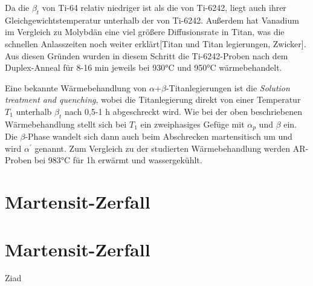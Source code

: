 Da die $\beta_{t}$ von Ti-64 relativ niedriger ist als die von Ti-6242, liegt auch ihrer Gleichgewichtstemperatur unterhalb der von Ti-6242. Außerdem hat Vanadium im Vergleich zu Molybdän eine viel größere Diffusionsrate in Titan, was die schnellen Anlasszeiten noch weiter erklärt[Titan und Titan legierungen, Zwicker]. Aus diesen Gründen wurden in diesem Schritt die Ti-6242-Proben nach dem Duplex-Anneal für 8-16 min jeweils bei 930°C und 950°C wärmebehandelt.

Eine bekannte Wärmebehandlung von $\alpha$+$\beta$-Titanlegierungen ist die  \textit{Solution treatment and quenching}, wobei die Titanlegierung direkt von einer Temperatur $T_{1}$ unterhalb  $\beta_{t}$ nach 0,5-1 h abgeschreckt wird. Wie bei der oben beschriebenen Wärmebehandlung stellt sich bei $T_{1}$ ein zweiphasiges Gefüge mit $\alpha_p$ und $\beta$ ein. Die $\beta$-Phase wandelt sich  dann auch beim Abschrecken martensitisch um und wird $\alpha^\prime$ genannt.
Zum Vergleich zu der studierten Wärmebehandlung werden AR-Proben bei 983°C für 1h erwärmt und wassergekühlt.

\section{Martensit-Zerfall}
\section{Martensit-Zerfall}{Ziad}